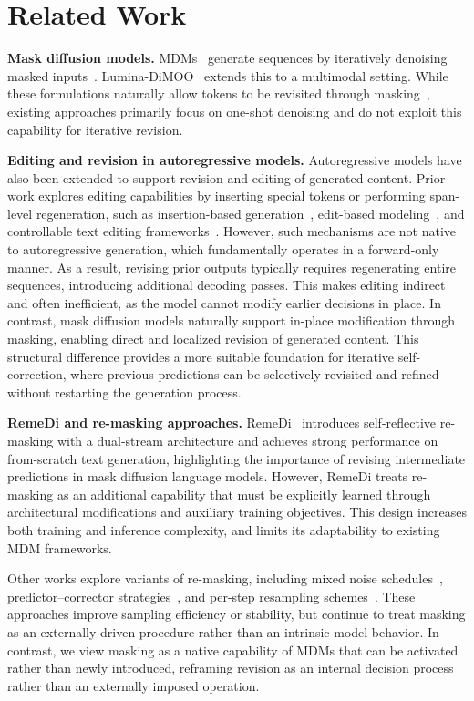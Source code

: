 \section{Related Work}
\label{sec:related-work}

\textbf{Mask diffusion models.}
MDMs~\citep{nie2025large,ye2025dream,lou2023discrete} generate sequences by iteratively denoising masked inputs~\citep{ghazvininejad2019mask,chang2022maskgit,li2022diffusion,gong2024scaling}. Lumina-DiMOO~\citep{xin2025lumina} extends this to a multimodal setting. While these formulations naturally allow tokens to be revisited through masking~\citep{gong2025diffucoder,xie2025dream}, existing approaches primarily focus on one-shot denoising and do not exploit this capability for iterative revision.

\textbf{Editing and revision in autoregressive models.}
Autoregressive models have also been extended to support revision and editing of generated content. Prior work explores editing capabilities by inserting special tokens or performing span-level regeneration, such as insertion-based generation~\citep{stern2019insertion,gu2019levenshtein}, edit-based modeling~\citep{guu2018generating}, and controllable text editing frameworks~\citep{malmi2019encode,mallinson2020felix,mallinson2022edit5,faltings2021text}. However, such mechanisms are not native to autoregressive generation, which fundamentally operates in a forward-only manner. As a result, revising prior outputs typically requires regenerating entire sequences, introducing additional decoding passes. This makes editing indirect and often inefficient, as the model cannot modify earlier decisions in place. In contrast, mask diffusion models naturally support in-place modification through masking, enabling direct and localized revision of generated content. This structural difference provides a more suitable foundation for iterative self-correction, where previous predictions can be selectively revisited and refined without restarting the generation process.

\textbf{RemeDi and re-masking approaches.}
RemeDi~\citep{huang2025don} introduces self-reflective re-masking with a dual-stream architecture and achieves strong performance on from-scratch text generation, highlighting the importance of revising intermediate predictions in mask diffusion language models. However, RemeDi treats re-masking as an additional capability that must be explicitly learned through architectural modifications and auxiliary training objectives. This design increases both training and inference complexity, and limits its adaptability to existing MDM frameworks.

Other works explore variants of re-masking, including mixed noise schedules~\citep{von2025generalized}, predictor--corrector strategies~\citep{wang2025remasking}, and per-step resampling schemes~\citep{song2025seed}. These approaches improve sampling efficiency or stability, but continue to treat masking as an externally driven procedure rather than an intrinsic model behavior. In contrast, we view masking as a native capability of MDMs that can be activated rather than newly introduced, reframing revision as an internal decision process rather than an externally imposed operation.
